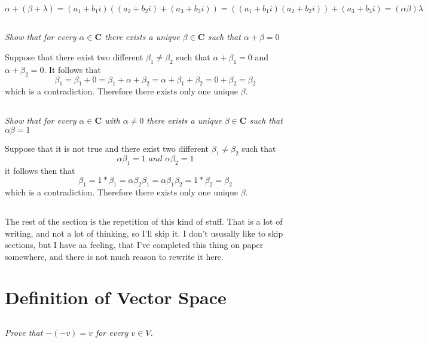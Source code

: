 \documentclass[11pt,oneside,titlepage]{book}
\begin{document}
$$\alpha + (\beta + \lambda)  = (a_1 + b_1 i) ((a_2 + b_2 i) + (a_3 + b_3 i)) =
((a_1 + b_1 i)(a_2 + b_2 i)) + (a_3 + b_3 i) = 
(\alpha \beta) \lambda$$

\subsection{}
\textit{Show that for every $\alpha \in \textbf{C}$ there exists a unique
  $\beta \in \textbf{C}$ such that $\alpha + \beta = 0$}

Suppose that there exist two different $\beta_1 \neq \beta_2$ such that
$\alpha + \beta_1 = 0$ and $\alpha + \beta_2 = 0$. It follows that
$$ \beta_1 = \beta_1 + 0 =  \beta_1 + \alpha + \beta_2 = \alpha + \beta_1  + \beta_2 = 0  + \beta_2 = \beta_2$$
which is a contradiction. Therefore there exists only one unique $\beta$.

\subsection{}
\textit{Show that for every $\alpha \in \textbf{C}$ with $\alpha \neq 0$
  there exists a unique $\beta \in \textbf{C}$ such that $\alpha \beta = 1$}

Suppose that it is not true and there exist two different
$\beta_1 \neq \beta_2$ such that
$$\alpha \beta_1 = 1 \textit{ and } \alpha \beta_2 = 1$$
it follows then that 
$$\beta_1 = 1 *  \beta_1 = \alpha \beta_2 \beta_1  =
\alpha \beta_1 \beta_2 = 1 * \beta_2 = \beta_2$$
which is a contradiction. Therefore there exists only one unique $\beta$.

\subsection{}
The rest of the section is the repetition of this kind of stuff.
That is a lot of writing, and not a lot of thinking, so I'll skip it.
I don't ususally like to skip sections, but I have  aa feeling, that I've
completed this thing on paper somewhere, and there is not much reason to
rewrite it here.

\section{Definition of Vector Space}

\subsection{}
\textit{Prove that $-(-v)= v$ for every $v \in V$.}
\end{document}
